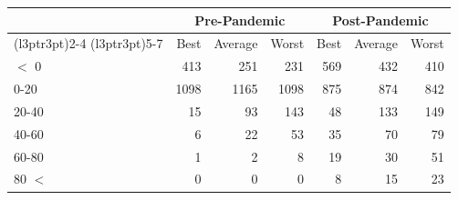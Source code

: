 
\begin{tabular}[t]{lrrrrrr}
\toprule
\multicolumn{1}{c}{ } & \multicolumn{3}{c}{Pre-Pandemic} & \multicolumn{3}{c}{Post-Pandemic} \\
\cmidrule(l{3pt}r{3pt}){2-4} \cmidrule(l{3pt}r{3pt}){5-7}
 & Best & Average & Worst & Best & Average & Worst\\
\midrule
$<$ 0 & 413 & 251 & 231 & 569 & 432 & 410\\
0-20 & 1098 & 1165 & 1098 & 875 & 874 & 842\\
20-40 & 15 & 93 & 143 & 48 & 133 & 149\\
40-60 & 6 & 22 & 53 & 35 & 70 & 79\\
60-80 & 1 & 2 & 8 & 19 & 30 & 51\\
80 $<$ & 0 & 0 & 0 & 8 & 15 & 23\\
\bottomrule
\end{tabular}
